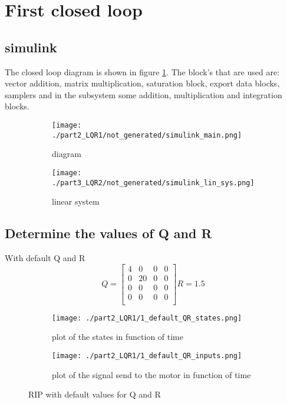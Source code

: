 \section{First closed loop}

\subsection{simulink}
The closed loop diagram is shown in figure \ref{fig:main_simulink_part3_LQR}. The block's that are used are: vector addition, matrix multiplication, saturation block, export data blocks, samplers and in the subsystem some addition, multiplication and integration blocks.
\begin{figure}[H]
	\centering
	\begin{subfigure}[b]{0.45\textwidth}
		\texttt{[image: ./part2\_LQR1/not\_generated/simulink\_main.png]}
		\caption{diagram}
		
	\end{subfigure}
	\begin{subfigure}[b]{0.45\textwidth}
		\texttt{[image: ./part3\_LQR2/not\_generated/simulink\_lin\_sys.png]}
		\caption{linear system}
	\end{subfigure}
	\caption{}
	\label{fig:main_simulink_part3_LQR}
\end{figure}



\subsection{Determine the values of Q and R}
With default Q and R
$$
Q=\begin{bmatrix}
4 & 0 & 0 & 0 \\
0 & 20 & 0 & 0 \\
0 & 0 & 0 & 0 \\
0 & 0 & 0 & 0 \\
\end{bmatrix}
R=1.5
$$
\begin{figure}[H]
	\centering
	\begin{subfigure}[b]{0.45\textwidth}
		\texttt{[image: ./part2\_LQR1/1\_default\_QR\_states.png]}
		\caption{plot of the states in function of time}
	\end{subfigure}
	\begin{subfigure}[b]{0.45\textwidth}
		\texttt{[image: ./part2\_LQR1/1\_default\_QR\_inputs.png]}
		\caption{plot of the signal send to the motor in function of time}
	\end{subfigure}
	\caption{RIP with default values for Q and R}
	\label{fig:default}
\end{figure}

